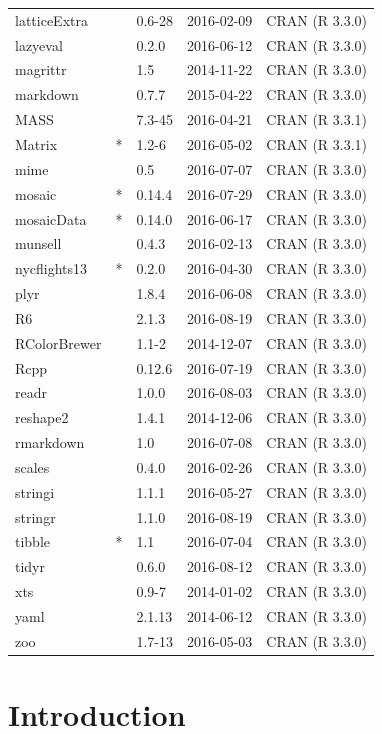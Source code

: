 \documentclass[]{tufte-book}
\begin{document}
\begin{longtable}{lllll}
latticeExtra &  & 0.6-28 & 2016-02-09 & CRAN (R 3.3.0)\\
lazyeval &  & 0.2.0 & 2016-06-12 & CRAN (R 3.3.0)\\
magrittr &  & 1.5 & 2014-11-22 & CRAN (R 3.3.0)\\
\addlinespace
markdown &  & 0.7.7 & 2015-04-22 & CRAN (R 3.3.0)\\
MASS &  & 7.3-45 & 2016-04-21 & CRAN (R 3.3.1)\\
Matrix & * & 1.2-6 & 2016-05-02 & CRAN (R 3.3.1)\\
mime &  & 0.5 & 2016-07-07 & CRAN (R 3.3.0)\\
mosaic & * & 0.14.4 & 2016-07-29 & CRAN (R 3.3.0)\\
\addlinespace
mosaicData & * & 0.14.0 & 2016-06-17 & CRAN (R 3.3.0)\\
munsell &  & 0.4.3 & 2016-02-13 & CRAN (R 3.3.0)\\
nycflights13 & * & 0.2.0 & 2016-04-30 & CRAN (R 3.3.0)\\
plyr &  & 1.8.4 & 2016-06-08 & CRAN (R 3.3.0)\\
R6 &  & 2.1.3 & 2016-08-19 & CRAN (R 3.3.0)\\
\addlinespace
RColorBrewer &  & 1.1-2 & 2014-12-07 & CRAN (R 3.3.0)\\
Rcpp &  & 0.12.6 & 2016-07-19 & CRAN (R 3.3.0)\\
readr &  & 1.0.0 & 2016-08-03 & CRAN (R 3.3.0)\\
reshape2 &  & 1.4.1 & 2014-12-06 & CRAN (R 3.3.0)\\
rmarkdown &  & 1.0 & 2016-07-08 & CRAN (R 3.3.0)\\
\addlinespace
scales &  & 0.4.0 & 2016-02-26 & CRAN (R 3.3.0)\\
stringi &  & 1.1.1 & 2016-05-27 & CRAN (R 3.3.0)\\
stringr &  & 1.1.0 & 2016-08-19 & CRAN (R 3.3.0)\\
tibble & * & 1.1 & 2016-07-04 & CRAN (R 3.3.0)\\
tidyr &  & 0.6.0 & 2016-08-12 & CRAN (R 3.3.0)\\
\addlinespace
xts &  & 0.9-7 & 2014-01-02 & CRAN (R 3.3.0)\\
yaml &  & 2.1.13 & 2014-06-12 & CRAN (R 3.3.0)\\
zoo &  & 1.7-13 & 2016-05-03 & CRAN (R 3.3.0)\\
\bottomrule
\end{longtable}

\chapter{Introduction}\label{intro}
\end{document}
